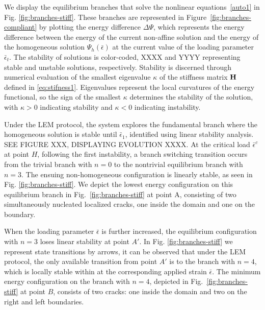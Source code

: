 We display the equilibrium branches that solve the nonlinear equations~\ref{auto1} in Fig. \ref{fig:branches-stiff}. These branches are represented in Figure~\ref{fig:branches-compliant} by plotting the energy difference $\Delta \Psi$, which represents the energy difference between the energy of the current non-affine solution and the energy of the homogeneous solution $\Psi_h(\bar{\epsilon})$ at the current value of the loading parameter $\bar\epsilon_t$. The stability of solutions is color-coded, XXXX and YYYY representing stable and unstable solutions, respectively. Stability is discerned through numerical evaluation of the smallest eigenvalue $\kappa$ of the stiffness matrix $\mathbf{H}$ defined in \eqref{eq:stifness1}. Eigenvalues represent the local curvatures of the energy functional, so the sign of the smallest  $\kappa$ determines the stability of the solution, with $\kappa > 0$ indicating stability and $\kappa < 0$ indicating instability.

Under the LEM protocol, the system explores the fundamental branch where the homogeneous solution is stable until $\bar\epsilon_1$, identified using linear stability analysis. SEE FIGURE XXX, DISPLAYING EVOLUTION XXXX. At the critical load $\bar\epsilon^c$  at point $H$, following the first instability, a branch switching transition occurs from the trivial branch with $n = 0$ to the nontrivial equilibrium branch with $n = 3$. The ensuing non-homogeneous configuration is linearly stable, as seen in Fig. \ref{fig:branches-stiff}. We depict the lowest energy configuration on this equilibrium branch in Fig.~\ref{fig:branches-stiff} at point A, consisting of two simultaneously nucleated localized cracks, one inside the domain and one on the boundary. 

When the loading parameter $\bar{\epsilon}$ is further increased, the equilibrium configuration with $n=3$ loses linear stability at point $A'$. In Fig. \ref{fig:branches-stiff} we represent state transitions by arrows, it can be observed that under the LEM protocol, the only available transition from point $A'$ is to the branch with $n=4$, which is locally stable within at the corresponding applied strain $\bar{\epsilon}$. The minimum energy configuration on the branch with $n=4$, depicted in Fig.~\ref{fig:branches-stiff} at point $B$, consists of two cracks: one inside the domain and two on the right and left boundaries.

